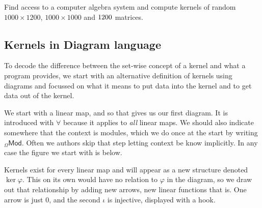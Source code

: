 \documentclass[12pt,twoside,dvipsnames,letterpaper]{memoir}
\begin{document}
\begin{prob}
    Find access to a computer algebra system 
    and compute kernels of random $1000\times 1200$, 
    $1000 \times 1000$ and $1200\time 1000$ matrices.
\end{prob}

\subsection{Kernels in Diagram language}
To decode the difference between the set-wise concept of a kernel 
and what a program provides, we start with an alternative definition of kernels 
using diagrams and focussed on what it means to put data into the kernel
and to get data out of the kernel.

We start with a linear map, and so that gives us our first diagram.
It is introduced with $\forall$ because it applies to \emph{all} linear maps.
We should also indicate somewhere that the context is modules, which 
we do once at the start by writing ${_{\Omega} \mathsf{Mod}}$.  Often 
we authors skip that step letting context be know implicitly.  In any case
the figure we start with is below.
\begin{center}
\end{center}

Kernels exist for every linear map and will appear as a new structure denoted 
$\ker\varphi$.  This on its own would have no relation to $\varphi$ in the diagram, so we draw out that relationship by adding new arrows, new 
linear functions that is.  One arrow is 
just $0$, and the second $\iota$ is injective, displayed with a hook.  
\begin{center}
\end{center}
\end{document}
